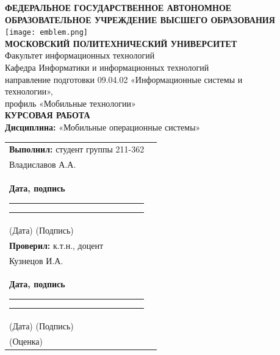 \documentclass[14pt, russian]{scrartcl}
\begin{document}
\sloppy

\begin{titlepage}
\begin{center}

{\large \textbf{ФЕДЕРАЛЬНОЕ ГОСУДАРСТВЕННОЕ АВТОНОМНОЕ}}\\[0.3cm]
{\large \textbf{ОБРАЗОВАТЕЛЬНОЕ УЧРЕЖДЕНИЕ ВЫСШЕГО ОБРАЗОВАНИЯ}}\\[0.5cm]

\texttt{[image: emblem.png]}\\[0.5cm]

{\large \textbf{МОСКОВСКИЙ ПОЛИТЕХНИЧЕСКИЙ УНИВЕРСИТЕТ}}\\[0.5cm]

{\large Факультет информационных технологий}\\[0.3cm]
{\large Кафедра Информатики и информационных технологий}\\[1cm]

{\large направление подготовки 09.04.02 «Информационные системы и}\\
{\large технологии»,}\\[0.3cm]
{\large профиль «Мобильные технологии»}\\[2cm]

{\Large \textbf{КУРСОВАЯ РАБОТА}}\\[1cm]

{\large \textbf{Дисциплина:} «Мобильные операционные системы»}\\[3cm]

\end{center}

\begin{flushright}
\begin{tabular}{ll}
{\large \textbf{Выполнил:} студент группы 211-362}\\
{\large Владиславов А.А.}\\[0.5cm]
{\large \textbf{Дата, подпись} \rule{5cm}{0.4pt} \rule{5cm}{0.4pt}}\\
{\scriptsize \hspace*{7.5cm}(Дата) \hspace{3.5cm}(Подпись)}\\[1cm]
{\large \textbf{Проверил:} к.т.н., доцент}\\
{\large Кузнецов И.А.}\\[0.5cm]
{\large \textbf{Дата, подпись} \rule{5cm}{0.4pt} \rule{5cm}{0.4pt}}\\
{\scriptsize \hspace*{7.5cm}(Дата) \hspace{3.5cm}(Подпись)}\\[0.3cm]
{\large \hspace*{11cm}(Оценка)}
\end{tabular}
\end{flushright}


\end{titlepage}
\end{document}
